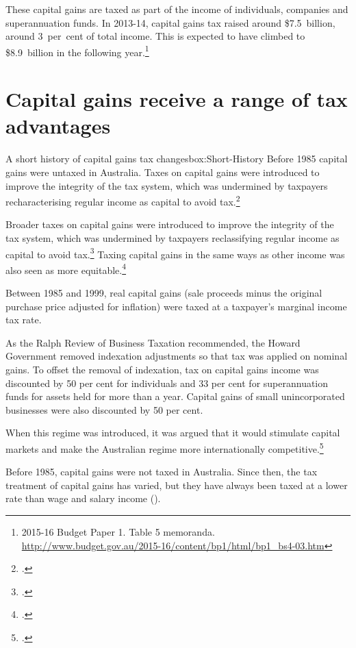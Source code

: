 These capital gains are taxed as part of the income of individuals, companies and superannuation funds. In 2013-14, capital gains tax raised around \$7.5~billion, around 3~per~cent of total income. This is expected to have climbed to \$8.9~billion in the following year.\footnote{2015-16 Budget Paper 1. Table 5 memoranda. \url{http://www.budget.gov.au/2015-16/content/bp1/html/bp1_bs4-03.htm}}

\section{Capital gains receive a range of tax advantages}\label{sec:CG-receive-tax-advantages}
\begin{smallbox}[p]{A short history of capital gains tax changes}{box:Short-History}
Before 1985 capital gains were untaxed in Australia. Taxes on capital gains were introduced to improve the integrity of the tax system, which was undermined by taxpayers recharacterising regular income as capital to avoid tax.\footcite{ReinhardtSteel2006}

Broader taxes on capital gains were introduced to improve the integrity of the tax system, which was undermined by taxpayers reclassifying regular income as capital to avoid tax.\footcites{Evans2005}{Kenny2005} Taxing capital gains in the same ways as other income was also seen as more equitable.\footcite{AustralianGovernment1985}

Between 1985 and 1999, real capital gains (sale proceeds minus the original purchase price adjusted for inflation) were taxed at a taxpayer’s marginal income tax rate. 

As the Ralph Review of Business Taxation recommended, the Howard Government removed indexation adjustments so that tax was applied on nominal gains. To offset the removal of indexation, tax on capital gains income was discounted by 50 per cent for individuals and 33 per cent for superannuation funds for assets held for more than a year. Capital gains of small unincorporated businesses were also discounted by 50 per cent. 

When this regime was introduced, it was argued that it would stimulate capital markets and make the Australian regime more internationally competitive.\footcite[][14, 598]{RalphReview1999}
\end{smallbox}
Before 1985, capital gains were not taxed in Australia. Since then, the tax treatment of capital gains has varied, but they have always been taxed at a lower rate than wage and salary income (). 

